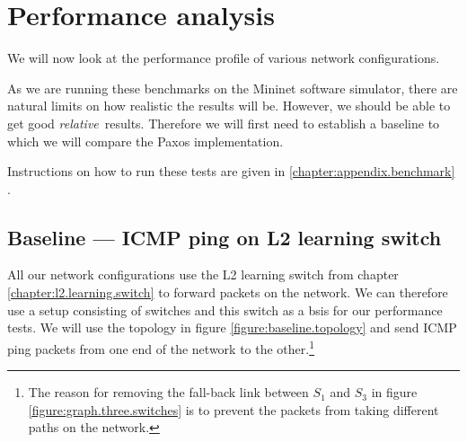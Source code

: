 \chapter{Performance analysis}
\label{chapter:analysis}

We will now look at the performance profile of various network
configurations.

As we are running these benchmarks on the Mininet software simulator, there
are natural limits on how realistic the results will be.  However, we should
be able to get good \textit{relative} results.   Therefore we will first
need to establish a baseline to which we will compare the
Paxos implementation.

Instructions on how to run these tests are given in
\ref{chapter:appendix.benchmark} .

\section{Baseline --- ICMP ping on L2 learning switch}
\label{chapter:baseline.benchmark}

All our network configurations use the L2 learning switch from chapter
\ref{chapter:l2.learning.switch} to forward packets on the network.  We can
therefore use a setup consisting of switches and this switch as a bsis for
our performance tests.  We will use the topology in figure
\ref{figure:baseline.topology} and send \ac{ICMP} ping packets from one end of
the network to the other.\footnote{
The reason for removing the fall-back link between $S_1$ and $S_3$ in figure
\ref{figure:graph.three.switches} is to prevent the packets from taking
different paths on the network.}

